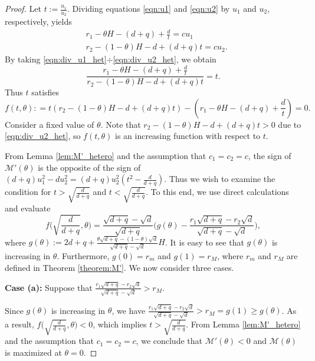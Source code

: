 \documentclass[10pt,a4paper]{amsart}
\def\MM{\mathcal{M}}
\begin{document}
\begin{proof}
    Let $t:=\frac{u_1}{u_2}$. Dividing equations \eqref{eqn:u1} and \eqref{eqn:u2} by $u_1$ and $u_2$, respectively, yields
 \begin{subequations}
     \begin{align}
         &r_1-\theta H -(d+q) + \frac{d}{t}=cu_1 \label{eqn:div_u1_het}\\
         &r_2-(1-\theta)H -d + (d+q)t = cu_2. \label{eqn:div_u2_het}
     \end{align}
\end{subequations}
By taking \eqref{eqn:div_u1_het}$\div$\eqref{eqn:div_u2_het}, we obtain
\[
\frac{r_1-\theta H -(d+q) + \frac{d}{t}}{r_2-(1-\theta)H -d + (d+q)t}=t.
\]
Thus $t$ satisfies
\[
f(t,\theta) : = t(r_2-(1-\theta)H -d + (d+q)t) - (r_1-\theta H -(d+q) + \frac{d}{t}) =0.
\]
Consider a fixed value of $\theta$. Note that $r_2-(1-\theta)H -d + (d+q)t>0$ due to \eqref{eqn:div_u2_het}, so $f(t,\theta)$ is an increasing function with respect to $t$. 


From Lemma \ref{lem:M'_hetero} and the assumption that $c_1=c_2=c$, the sign of $\MM'(\theta)$ is the opposite of the sign of $(d+q)u_1^2-du_2^2=(d+q)u_2^2(t^2-\frac{d}{d+q})$. Thus we wish to examine the condition for $t>\sqrt{\frac{d}{d+q}}$ and $t<\sqrt{\frac{d}{d+q}}$. To this end, we use direct calculations and evaluate
\begin{equation}
    f\bigg(\sqrt{\frac{d}{d+q}},\theta\bigg) = \frac{\sqrt{d+q}-\sqrt{d}}{\sqrt{d+q}}\bigg(g(\theta)-\frac{r_1\sqrt{d+q}-r_2\sqrt{d}}{\sqrt{d+q}-\sqrt{d}}\bigg),
\end{equation}
where $g(\theta):=2d+q+\frac{\theta\sqrt{d+q}-(1-\theta)\sqrt{d}}{\sqrt{d+q}-\sqrt{d}}H$. It is easy to see that $g(\theta)$ is increasing in $\theta$. Furthermore, $g(0)=r_m$ and $g(1)=r_M$, where $r_m$ and $r_M$ are defined in Theorem \ref{theorem:M'}. We now consider three cases. 

\vspace{.1in}
\noindent\textbf{Case (a):} Suppose that
$\frac{r_1\sqrt{d+q}-r_2\sqrt{d}}{\sqrt{d+q}-\sqrt{d}}>r_M$.

Since $g(\theta)$ is increasing in $\theta$, we have $\frac{r_1\sqrt{d+q}-r_2\sqrt{d}}{\sqrt{d+q}-\sqrt{d}}>r_M=g(1)\geq g(\theta)$. As a result, 
$f\big(\sqrt{\frac{d}{d+q}},\theta\big) <0$, which implies $t>\sqrt{\frac{d}{d+q}}$. From Lemma \ref{lem:M'_hetero} and the assumption that $c_1=c_2=c$, we  conclude that $\MM'(\theta)<0$ and $\MM(\theta)$ is maximized at $\theta=0$.


\end{proof}
\end{document}
